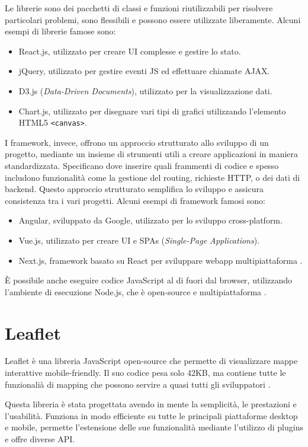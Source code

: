 Le librerie sono dei pacchetti di classi e funzioni riutilizzabili per risolvere particolari problemi, sono flessibili e possono essere utilizzate liberamente. Alcuni esempi di librerie famose sono:
\begin{itemize}
    \item React.js, utilizzato per creare UI complesse e gestire lo stato.
    \item jQuery, utilizzato per gestire eventi JS ed effettuare chiamate AJAX.
    \item D3.js (\textit{Data-Driven Documents}), utilizzato per la visualizzazione dati.
    \item Chart.js, utilizzato per disegnare vari tipi di grafici utilizzando l'elemento HTML5 \Verb_<canvas>_.
\end{itemize}

I framework, invece, offrono un approccio strutturato allo sviluppo di un progetto, mediante un insieme di strumenti utili a creare applicazioni in maniera standardizzata. Specificano dove inserire quali frammenti di codice e spesso includono funzionalità come la gestione del routing, richieste HTTP, o dei dati di backend. Questo approccio strutturato semplifica lo sviluppo e assicura consistenza tra i vari progetti. Alcuni esempi di framework famosi sono:
\begin{itemize}
    \item Angular, sviluppato da Google, utilizzato per lo sviluppo cross-platform.
    \item Vue.js, utilizzato per creare UI e SPAs (\textit{Single-Page Applications}).
    \item Next.js, framework basato su React per sviluppare webapp multipiattaforma \cite{JS_Frameworks_Libraries}.
\end{itemize}

\`E possibile anche eseguire codice JavaScript al di fuori dal browser, utilizzando l'ambiente di esecuzione Node.js, che è open-source e multipiattaforma \cite{Node.js}.

\section{Leaflet}
Leaflet è una libreria JavaScript open-source che permette di visualizzare mappe interattive mobile-friendly. Il suo codice pesa solo 42KB, ma contiene tutte le funzionalià di mapping che possono servire a quasi tutti gli sviluppatori \cite{Leaflet_Overview, Leaflet}.

Questa libreria è stata progettata avendo in mente la semplicità, le prestazioni e l'usabilità. Funziona in modo efficiente su tutte le principali piattaforme desktop e mobile, permette l'estensione delle sue funzionalità mediante l'utilizzo di plugins e offre diverse API.

